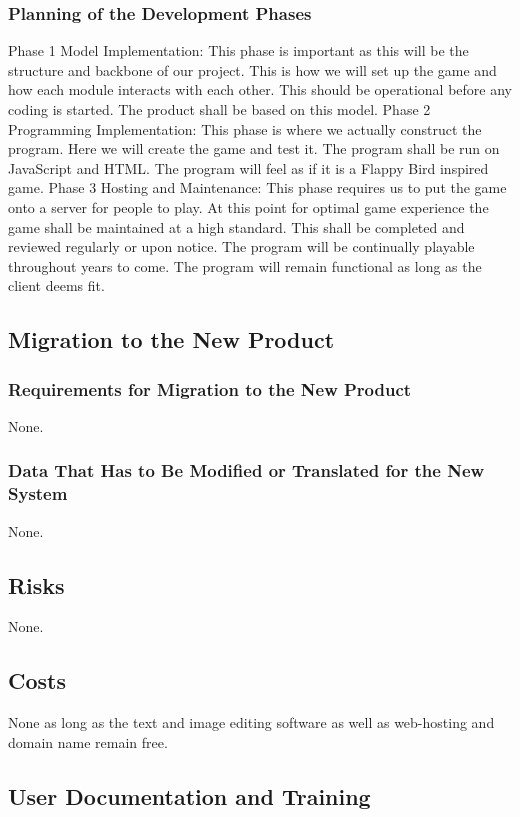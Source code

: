 \documentclass[11pt, oneside]{article}   	%
\begin{document}
\subsubsection{Planning of the Development Phases}
Phase 1 Model Implementation:
This phase is important as this will be the structure and backbone of our project. This is how we will set up the game and how each module interacts with each other. This should be operational before any coding is started. The product shall be based on this model.
Phase 2 Programming Implementation:
This phase is where we actually construct the program. Here we will create the game and test it. The program shall be run on JavaScript and HTML. The program will feel as if it is a Flappy Bird inspired game.
Phase 3 Hosting and Maintenance:
This phase requires us to put the game onto a server for people to play. At this point for optimal game experience the game shall be maintained at a high standard. This shall be completed and reviewed regularly or upon notice. The program will be continually playable throughout years to come. The program will remain functional as long as the client deems fit.


\subsection{Migration to the New Product}
\subsubsection{Requirements for Migration to the New Product}
None.


\subsubsection{Data That Has to Be Modified or Translated for the New System}
None.


\subsection{Risks}
None.


\subsection{Costs}
None as long as the text and image editing software as well as web-hosting and domain name remain free.


\subsection{User Documentation and Training}
\end{document}
